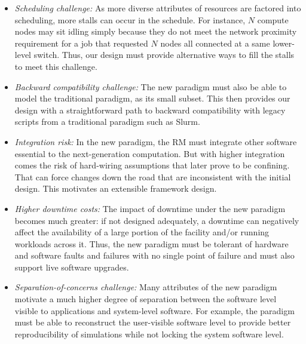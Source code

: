 \documentclass[10pt]{article}
\newif\ifcomments
\newcommand{\slurm}{Slurm}
\begin{document}
\begin{itemize}
\item{\sl Scheduling challenge:} As more diverse attributes of resources
      are factored into scheduling, more stalls can occur in the schedule.
      For instance, $N$ compute nodes may sit idling simply because they do not meet
      the network proximity requirement for a job that requested 
      $N$ nodes all connected at a same lower-level switch. Thus, our design 
      must provide alternative ways to fill the stalls to meet this 
      challenge.

\item{\sl Backward compatibility challenge:} The new paradigm must also be
      able to model the traditional paradigm, as its small subset. This
      then provides our design with a straightforward path to 
      backward compatibility with legacy scripts from a traditional 
      paradigm such as \slurm.

\item{\sl Integration risk:} In the new paradigm, the RM must 
     integrate other software essential to the next-generation computation. 
     But with higher integration comes the risk of hard-wiring assumptions
     that later prove to be confining. That can force changes down the road
     that are inconsistent with the initial design. This motivates
     an extensible framework design. 
     
\item{\sl Higher downtime costs:} The impact of downtime under the 
     new paradigm becomes much greater: if not designed adequately, 
     a downtime can negatively affect the availability of
     a large portion of the facility and/or running workloads across it.
     Thus, the new paradigm must be tolerant of hardware and software faults 
     and failures with no single point of failure and must also support 
     live software upgrades.

\ifcomments
\marginpar{\tiny {\bf ned-review:}
How to reconcile conflict with security requirements?  For example, an attacker
might request a known-vulnerable kernel version.
{\bf jg:} Restrictions on this are explained in {\em Lighweight Virtualiation Model} paragraph.}
\fi
\item{\sl Separation-of-concerns challenge:} Many attributes of the new
     paradigm motivate a much higher degree of separation between
     the software level visible to applications and system-level 
     software. For example, the paradigm must be able to reconstruct the user-visible
     software level to provide better reproducibility of simulations while not
     locking the system software level. 
   

\end{itemize}
\end{document}
